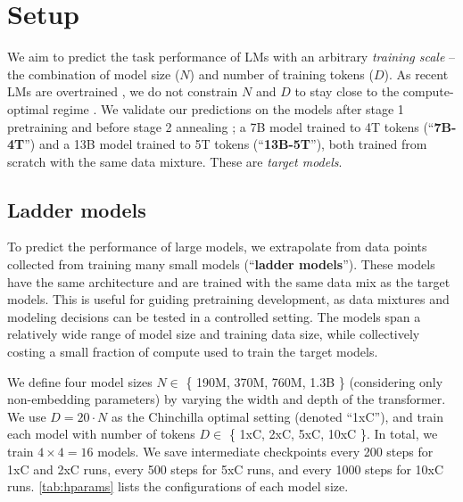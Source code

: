 \section{Setup}
\label{sec:setup}

We aim to predict the task performance of LMs with an arbitrary \textit{training scale} -- the combination of model size ($N$) and number of training tokens ($D$).
As recent LMs are overtrained \citep{Dubey2024TheL3,Li2024DataCompLMIS,Bai2023QwenTR}, we do not constrain $N$ and $D$ to stay close to the compute-optimal regime \citep{Hoffmann2022TrainingCL}.
We validate our predictions on the \basemodelname{} models after stage 1 pretraining and before stage 2 annealing \citep{OLMo20242O2}; a 7B model trained to 4T tokens (``\textbf{7B-4T}'') and a 13B model trained to 5T tokens (``\textbf{13B-5T}''), both trained from scratch with the same data mixture.
These are \textit{target models}. 

\subsection{Ladder models}
\label{sec:ladder}

To predict the performance of large models, we extrapolate from data points collected from training many small models (``\textbf{ladder models}'').
These models have the same architecture and are trained with the same data mix as the target models. 
This is useful for guiding pretraining development, as data mixtures and modeling decisions can be tested in a controlled setting. 
The models span a relatively wide range of model size and training data size, while collectively costing a small fraction of compute used to train the target models.  

We define four model sizes $N \in $ \{ 190M, 370M, 760M, 1.3B \} (considering only non-embedding parameters) by varying the width and depth of the transformer.
We use $D = 20 \cdot N$ as the Chinchilla optimal setting \citep{Hoffmann2022TrainingCL} (denoted ``1xC''), and train each model with number of tokens $D \in $ \{ 1xC, 2xC, 5xC, 10xC \}.
In total, we train $4 \times 4 = 16$ models.
We save intermediate checkpoints every 200 steps for 1xC and 2xC runs, every 500 steps for 5xC runs, and every 1000 steps for 10xC runs.
\autoref{tab:hparams} lists the configurations of each model size.



